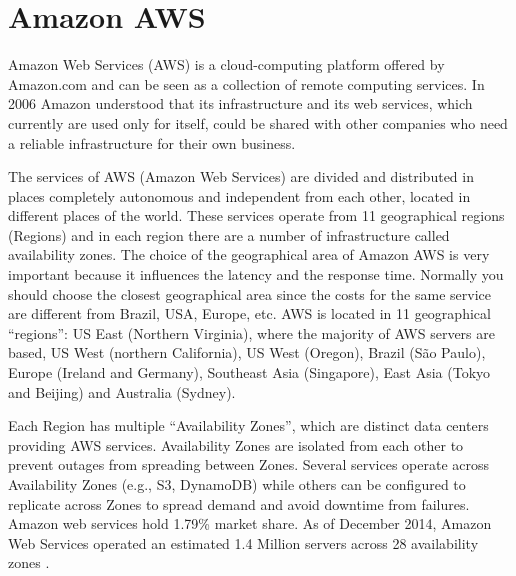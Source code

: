 \section{Amazon AWS}
\label{sec:Amazon AWS}

Amazon Web Services (AWS) is a cloud-computing platform offered by Amazon.com and can be seen as a collection of remote computing services.
In 2006 Amazon understood that its infrastructure and its web services, which currently are used only for itself, could be shared with other companies who need a reliable infrastructure for their own business.

The services of AWS (Amazon Web Services) are divided and distributed in places completely autonomous and independent from each other, located in different places of the world. These services operate from 11 geographical regions (Regions) and in each region there are a number of infrastructure called availability zones.
The choice of the geographical area of Amazon AWS is very important because it influences the latency and the response time. Normally you should choose the closest geographical area since the costs for the same service are different from Brazil, USA, Europe, etc.
AWS is located in 11 geographical ``regions'': US East (Northern Virginia), where the majority of AWS servers are based,\cite{aws_stats1} US West (northern California), US West (Oregon), Brazil (São Paulo), Europe (Ireland and Germany), Southeast Asia (Singapore), East Asia (Tokyo and Beijing) and Australia (Sydney).

Each Region has multiple ``Availability Zones'', which are distinct data centers providing AWS services. Availability Zones are isolated from each other to prevent outages from spreading between Zones. Several services operate across Availability Zones (e.g., S3, DynamoDB) while others can be configured to replicate across Zones to spread demand and avoid downtime from failures. Amazon web services hold 1.79\% market share. As of December 2014, Amazon Web Services operated an estimated 1.4 Million servers across 28 availability zones \cite{aws_stats2}.

